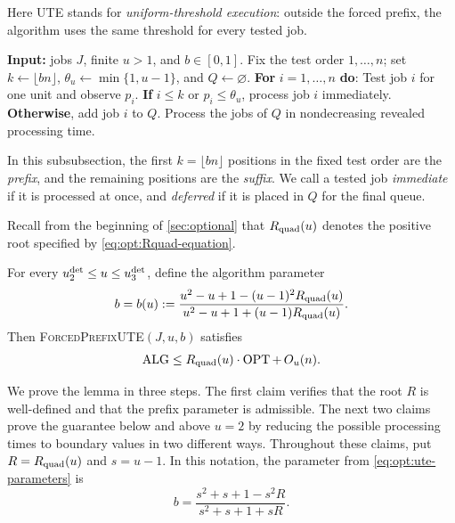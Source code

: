 Here UTE stands for \emph{uniform-threshold execution}: outside the forced
prefix, the algorithm uses the same threshold for every tested job.

\begin{algorithm}[H]
\caption{}
\label{alg:ute}
\begin{algorithmic}
\Statex \textbf{Input:} jobs $J$, finite $u>1$, and $b\in[0,1]$.
\State Fix the test order $1,\ldots,n$; set
       $k\gets\lfloor bn\rfloor$, $\theta_u\gets\min\{1,u-1\}$,
       and $Q\gets\varnothing$.
\State \textbf{For} $i=1,\ldots,n$ \textbf{do}:
\State \quad Test job $i$ for one unit and observe $p_i$.
\State \quad \textbf{If} $i\le k$ or $p_i\le\theta_u$, process job $i$
       immediately.
\State \quad \textbf{Otherwise}, add job $i$ to $Q$.
\State Process the jobs of $Q$ in nondecreasing revealed processing time.
\end{algorithmic}
\end{algorithm}

In this subsubsection, the first $k=\lfloor bn\rfloor$ positions in the fixed
test order are the \emph{prefix}, and the remaining positions are the
\emph{suffix}.  We call a tested job \emph{immediate} if it is processed at
once, and \emph{deferred} if it is placed in $Q$ for the final queue.

Recall from the beginning of \cref{sec:optional} that $R_{\mathrm{quad}}(u)$ denotes
the positive root specified by \cref{eq:opt:Rquad-equation}.

\begin{lemma}
\label{lem:opt:ute-endpoint-game}
For every $u_{2}^{\mathrm{det}}\le u\le u_{3}^{\mathrm{det}}$, define the algorithm parameter
\begin{equation}
 b=b(u)\mathrel{:=}
 \frac{u^2-u+1-(u-1)^2R_{\mathrm{quad}}(u)}
      {u^2-u+1+(u-1)R_{\mathrm{quad}}(u)}.
 \label{eq:opt:ute-parameters}
\end{equation}
Then
\textnormal{\textsc{ForcedPrefixUTE}}$(J,u,b)$ satisfies
\begin{equation}
 \operatorname{ALG}\le R_{\mathrm{quad}}(u)\cdot\operatorname{OPT}+\,O_u(n).
 \label{eq:opt:ute-full-upper}
\end{equation}
\end{lemma}

We prove the lemma in three steps.  The first claim verifies that the root
$R$ is well-defined and that the prefix parameter is admissible.  The next
two claims prove the guarantee below and above $u=2$ by reducing the possible
processing times to boundary values in two different ways.  Throughout these claims,
put $R=R_{\mathrm{quad}}(u)$ and $s=u-1$.  In this notation, the
parameter from \cref{eq:opt:ute-parameters} is
\[
 b=\frac{s^2+s+1-s^2R}{s^2+s+1+sR}.
\]

